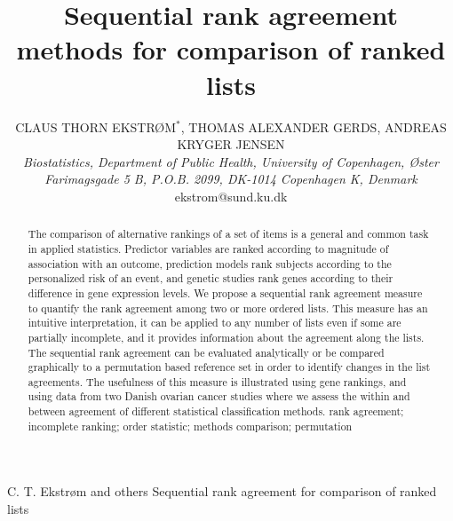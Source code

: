 \documentclass[oupdraft]{bio}
\newcommand{\added}[1]{{\color{added}{}#1}}
\begin{document}
\title{Sequential rank agreement methods for comparison of ranked lists}

\author{CLAUS THORN EKSTRØM$^\ast$, THOMAS ALEXANDER GERDS, ANDREAS
  KRYGER JENSEN\\[4pt]
%
\textit{%
Biostatistics, Department of Public Health,
University of Copenhagen,
Øster Farimagsgade 5 B, P.O.B. 2099,
DK-1014 Copenhagen K, Denmark}
\\[2pt]
{ekstrom@sund.ku.dk}}





\markboth%
{C. T. Ekstrøm and others}
{Sequential rank agreement for comparison of ranked
  lists}

\maketitle



\begin{abstract} { The comparison of alternative rankings of a set of
    items is a general and common task in applied
    statistics. Predictor variables are ranked according to magnitude
    of association with an outcome, prediction models rank subjects
    according to the personalized risk of an event, and genetic
    studies rank genes according to their difference in gene
    expression levels. \added{We propose a sequential rank agreement
      measure to quantify the rank agreement among two or more ordered
      lists. This measure has an intuitive interpretation, it can be
      applied to any number of lists even if some are partially
      incomplete, and it provides information about the agreement
      along the lists. The sequential rank agreement can be evaluated
      analytically or be compared graphically to a permutation based
      reference set in order to identify changes in the list
      agreements.}  The usefulness of this measure is illustrated
    using gene rankings, and using data from two Danish ovarian cancer
    studies where we assess the within and between agreement of
    different statistical classification methods.}  {rank agreement;
    incomplete ranking; order statistic; methods comparison;
    permutation}
\end{abstract}
\end{document}

